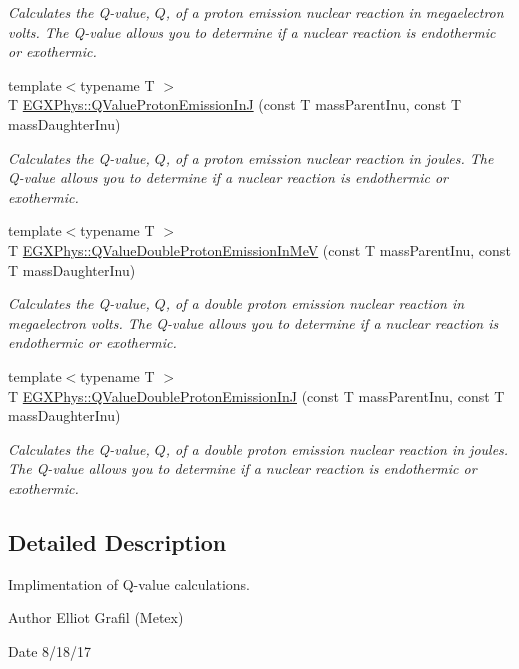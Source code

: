 \begin{DoxyCompactItemize}
\begin{DoxyCompactList}\small\item\em Calculates the Q-\/value, $Q$, of a proton emission nuclear reaction in megaelectron volts. The Q-\/value allows you to determine if a nuclear reaction is endothermic or exothermic. \end{DoxyCompactList}\item 
{\footnotesize template$<$typename T $>$ }\\T \mbox{\hyperlink{group___e_g_x_phys-_q_value-_proton_emission_ga41f19b0d9a2dc06e89de44aaa2d48d62}{E\+G\+X\+Phys\+::\+Q\+Value\+Proton\+Emission\+InJ}} (const T mass\+Parent\+Inu, const T mass\+Daughter\+Inu)
\begin{DoxyCompactList}\small\item\em Calculates the Q-\/value, $Q$, of a proton emission nuclear reaction in joules. The Q-\/value allows you to determine if a nuclear reaction is endothermic or exothermic. \end{DoxyCompactList}\item 
{\footnotesize template$<$typename T $>$ }\\T \mbox{\hyperlink{group___e_g_x_phys-_q_value-_proton_emission_ga61d07711da603f2f4426fbb3f271fc34}{E\+G\+X\+Phys\+::\+Q\+Value\+Double\+Proton\+Emission\+In\+MeV}} (const T mass\+Parent\+Inu, const T mass\+Daughter\+Inu)
\begin{DoxyCompactList}\small\item\em Calculates the Q-\/value, $Q$, of a double proton emission nuclear reaction in megaelectron volts. The Q-\/value allows you to determine if a nuclear reaction is endothermic or exothermic. \end{DoxyCompactList}\item 
{\footnotesize template$<$typename T $>$ }\\T \mbox{\hyperlink{group___e_g_x_phys-_q_value-_proton_emission_gab8979dd25aeac115834a4a8b233fec6f}{E\+G\+X\+Phys\+::\+Q\+Value\+Double\+Proton\+Emission\+InJ}} (const T mass\+Parent\+Inu, const T mass\+Daughter\+Inu)
\begin{DoxyCompactList}\small\item\em Calculates the Q-\/value, $Q$, of a double proton emission nuclear reaction in joules. The Q-\/value allows you to determine if a nuclear reaction is endothermic or exothermic. \end{DoxyCompactList}\end{DoxyCompactItemize}


\subsection{Detailed Description}
Implimentation of Q-\/value calculations. 

\begin{DoxyAuthor}{Author}
Elliot Grafil (Metex) 
\end{DoxyAuthor}
\begin{DoxyDate}{Date}
8/18/17 
\end{DoxyDate}
